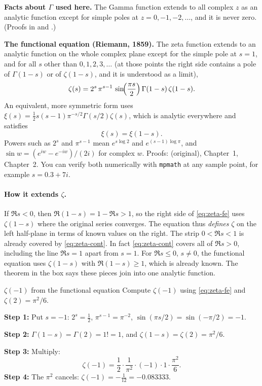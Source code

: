 \begin{beyond}
\textbf{Facts about $\Gamma$ used here.} The Gamma function extends to all complex $z$ as an analytic function except for simple poles at $z=0,-1,-2,\dots$, and it is never zero. (Proofs in \cite{titchmarsh} and \cite{rhb}.)

\textbf{The functional equation (Riemann, 1859).} The zeta function extends to an analytic function on the whole complex plane except for the simple pole at $s=1$, and for all $s$ other than $0,1,2,3,\dots$ (at those points the right side contains a pole of $\Gamma(1-s)$ or of $\zeta(1-s)$, and it is understood as a limit),
\begin{equation}
\zeta(s)=2^{s}\,\pi^{s-1}\,\sin\!\Bigl(\frac{\pi s}{2}\Bigr)\,\Gamma(1-s)\,\zeta(1-s).
\label{eq:zeta-fe}
\end{equation}
An equivalent, more symmetric form uses $\xi(s)=\tfrac12s(s-1)\pi^{-s/2}\Gamma(s/2)\zeta(s)$, which is analytic everywhere and satisfies
\begin{equation}
\xi(s)=\xi(1-s).
\label{eq:zeta-xi}
\end{equation}
Powers such as $2^s$ and $\pi^{s-1}$ mean $e^{s\log2}$ and $e^{(s-1)\log\pi}$, and $\sin w=(e^{iw}-e^{-iw})/(2i)$ for complex $w$. Proofs: \cite{riemann1859} (original), \cite{edwards} Chapter~1, \cite{titchmarsh} Chapter~2. You can verify both numerically with \texttt{mpmath} at any sample point, for example $s=0.3+7i$.
\end{beyond}

\paragraph{How it extends $\zeta$.} If $\Re s<0$, then $\Re(1-s)=1-\Re s>1$, so the right side of \cref{eq:zeta-fe} uses $\zeta(1-s)$ where the original series converges. The equation thus \emph{defines} $\zeta$ on the left half-plane in terms of known values on the right. The strip $0<\Re s<1$ is already covered by \cref{eq:zeta-cont}. In fact \cref{eq:zeta-cont} covers all of $\Re s>0$, including the line $\Re s=1$ apart from $s=1$. For $\Re s\le0$, $s\ne0$, the functional equation uses $\zeta(1-s)$ with $\Re(1-s)\ge1$, which is already known. The theorem in the box says these pieces join into one analytic function.

\begin{sample}{$\zeta(-1)$ from the functional equation}
Compute $\zeta(-1)$ using \cref{eq:zeta-fe} and $\zeta(2)=\pi^2/6$.

\textbf{Step 1:} Put $s=-1$: $2^{s}=\tfrac12$, $\pi^{s-1}=\pi^{-2}$, $\sin(\pi s/2)=\sin(-\pi/2)=-1$.

\textbf{Step 2:} $\Gamma(1-s)=\Gamma(2)=1!=1$, and $\zeta(1-s)=\zeta(2)=\pi^2/6$.

\textbf{Step 3:} Multiply:
\[
\zeta(-1)=\frac12\cdot\frac1{\pi^2}\cdot(-1)\cdot1\cdot\frac{\pi^2}{6}.
\]
\textbf{Step 4:} The $\pi^2$ cancels: $\boxed{\zeta(-1)=-\tfrac1{12}=-0.083333.}$
\end{sample}

